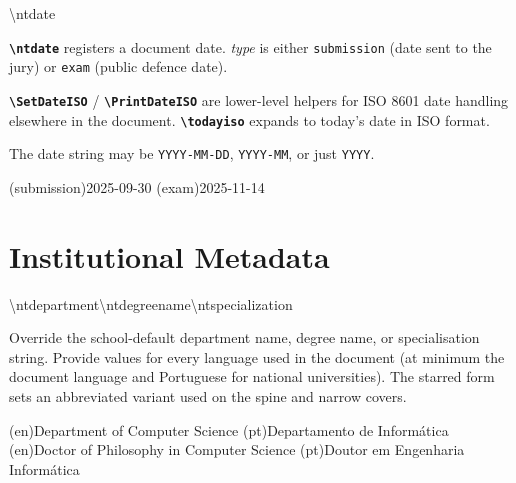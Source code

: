 \bigskip

\begin{macrodoc}{\textbackslash ntdate}

\textbf{\texttt{\textbackslash ntdate}} registers a document date.
\emph{type} is either \texttt{submission} (date sent to the jury) or
\texttt{exam} (public defence date).

\textbf{\texttt{\textbackslash SetDateISO}} / \textbf{\texttt{\textbackslash PrintDateISO}}
are lower-level helpers for ISO 8601 date handling elsewhere in the document.
\textbf{\texttt{\textbackslash todayiso}} expands to today's date in ISO format.

The date string may be \texttt{YYYY-MM-DD}, \texttt{YYYY-MM}, or just \texttt{YYYY}.
\begin{latexcode}
\ntdate(submission){2025-09-30}
\ntdate(exam){2025-11-14}
\end{latexcode}
\end{macrodoc}

\section{Institutional Metadata}
\label{sec:int_institution}

\begin{macrodoc}{\textbackslash ntdepartment\quad\textbackslash ntdegreename\quad\textbackslash ntspecialization}

Override the school-default department name, degree name, or
specialisation string.  Provide values for every language used in
the document (at minimum the document language and Portuguese for
national universities).  The starred form sets an abbreviated variant
used on the spine and narrow covers.

\begin{latexcode}
\ntdepartment(en){Department of Computer Science}
\ntdepartment(pt){Departamento de Informática}
\ntdegreename(en){Doctor of Philosophy in Computer Science}
\ntdegreename(pt){Doutor em Engenharia Informática}
\end{latexcode}
\end{macrodoc}

